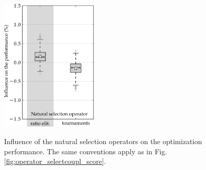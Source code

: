 \documentclass{ametsoc}
\begin{document}
\begin{figure}[t]
	\begin{center}
		\noindent\includegraphics[width=11pc,angle=0]{fig12.pdf}\\
	\end{center}
	\caption{Influence of the natural selection operators on the optimization performance. The same conventions apply as in Fig. \ref{fig:operator_selectcoupl_score}.}
	\label{fig:operator_selectnat_score}
\end{figure}
\end{document}
